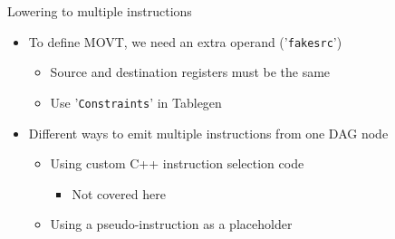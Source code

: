 \begin{frame}[fragile]{Lowering to multiple instructions}

\begin{itemize}
    \item To define MOVT, we need an extra operand ('\texttt{fakesrc}')
    \begin{itemize}
        \item Source and destination registers must be the same
        \item Use '\texttt{Constraints}' in Tablegen
    \end{itemize}
\end{itemize}


\begin{itemize}
    \item Different ways to emit multiple instructions from one DAG node
    \begin{itemize}
        \item Using custom C++ instruction selection code
            \begin{itemize}
                \item Not covered here
            \end{itemize}
        \item Using a pseudo-instruction as a placeholder
    \end{itemize}
\end{itemize}

\end{frame}


